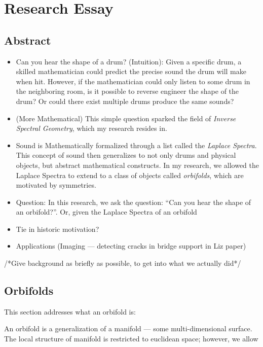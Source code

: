 \documentclass{article}[11pt]
\theoremstyle{definition}
\begin{document}
\section{Research Essay}
\subsection{Abstract}
\begin{itemize}
    \item Can you hear the shape of a drum? (Intuition): Given a
        specific drum, a skilled mathematician could predict the precise
        sound the drum will make when hit. However, if the mathematician
        could only listen to some drum in the neighboring room, is it
        possible to reverse engineer the shape of the drum? Or could there
        exist multiple drums produce the same sounds? 
        
    \item (More Mathematical) This simple question sparked the field of
        \emph{Inverse Spectral Geometry}, which my research resides in.

    \item Sound is Mathematically formalized through a list called the
        \emph{Laplace Spectra}. This concept of sound then generalizes to
        not only drums and physical objects, but abstract mathematical
        constructs. In my research, we allowed the Laplace Spectra to
        extend to a class of objects called \emph{orbifolds}, which are
        motivated by symmetries.

    \item Question: In this research, we ask the question: ``Can you hear the
        shape of an orbifold?''. Or, given the Laplace Spectra of an
        orbifold

    \item Tie in historic motivation?
    \item Applications (Imaging --- detecting cracks in bridge support in
        Liz paper)
\end{itemize}
/*Give background as briefly as possible, to get into what we actually did*/
\subsection{Orbifolds}
This section addresses what an orbifold is:

An orbifold is a generalization of a manifold --- some multi-dimensional
surface. The local structure of manifold is restricted to euclidean space;
however, we allow 
\end{document}
